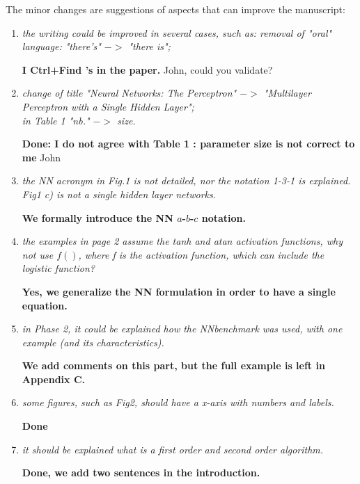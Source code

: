\documentclass[12pt]{article}
\newcommand{\red}[1]{{\color{red}#1}}
\begin{document}
The minor changes are suggestions of aspects that can improve the manuscript:
\begin{enumerate}
\item \textit{the writing could be improved in several cases, such as: removal of "oral" language: "there’s" $->$ "there is";}

\textbf{I Ctrl+Find 's in the paper.}
\red{John, could you validate?}

\item \textit{change of title "Neural Networks: The Perceptron" $->$ "Multilayer Perceptron with a Single Hidden Layer";\\
 in Table 1 "nb." $->$ size.}
 
 \textbf{Done: I do not agree with Table 1 : parameter size is not correct to me}
\red{John}

\item \textit{the NN acronym in Fig.1 is not detailed, nor the notation 1-3-1 is explained.\\ 
Fig1 c) is not a single hidden layer networks.}

\textbf{We formally introduce the NN $a$-$b$-$c$ notation.}


\item \textit{the examples in page 2 assume the tanh and atan activation functions, why not use $f()$, where f is the activation function, which can include the logistic function?}

\textbf{Yes, we generalize the NN formulation in order to have a single equation.}


\item \textit{in Phase 2, it could be explained how the NNbenchmark was used, with one example (and its characteristics).}

\textbf{We add comments on this part, but the full example is left in Appendix C.}


\item \textit{some figures, such as Fig2, should have a x-axis with numbers and labels.}

\textbf{Done}


\item \textit{it should be explained what is a first order and second order algorithm.}

\textbf{Done, we add two sentences in the introduction.}


\end{enumerate}
\end{document}

